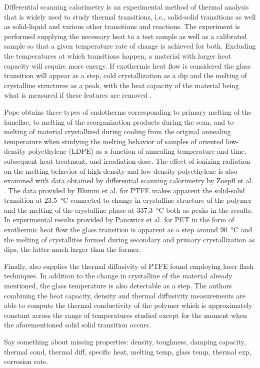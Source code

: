 Differential scanning calorimetry is an experimental method of thermal analysis that is widely used to study thermal transitions, i.e., solid-solid transitions as well as solid-liquid and various other transitions and reactions.
The experiment is performed supplying the necessary heat to a test sample as well as a calibrated sample so that a given temperature rate of change is achieved for both.
Excluding the temperatures at which transitions happen, a material with larger heat capacity will require more energy.
If exothermic heat flow is considered the glass transition will appear as a step, cold crystallization as a dip and the melting of crystalline structures as a peak, with the heat capacity of the material being what is measured if these features are removed \citep{lukasDifferentialScanningCalorimetry2009}.

Pope \citep{popeCharacterizationOrientedLowdensity1976} obtains three types of endotherms corresponding to primary melting of the lamellae, to melting of the reorganization products during the scan, and to melting of material crystallized during cooling from the original annealing temperature when studying the melting behavior of samples of oriented low-density polyethylene (LDPE) as a function of annealing temperature and time, subsequent heat treatment, and irradiation dose.
The effect of ionizing radiation on the melting behavior of high-density and low-density
polyethylene is also examined with data obtained by differential scanning calorimetry by Zoepfl et al. \citep{zoepflDifferentialScanningCalorimetry1984}.
The data provided by Blumm et al. \citep{blummCharacterizationPTFEUsing2010} for PTFE makes apparent the solid-solid transition at \SI{23.5}{\celsius} connected to change in crystalline structure of the polymer and the melting of the crystalline phase at \SI{337.3}{\celsius} both as peaks in the results.
In experimental results provided by Panowicz et al. \citep{panowiczPropertiesPolyethyleneTerephthalate2021} for PET in the form of exothermic heat flow the glass transition is apparent as a step around \SI{90}{\celsius} and the melting of crystallites formed during secondary and primary crystallization as dips, the latter much larger than the former.

Finally, \cite{blummCharacterizationPTFEUsing2010} also supplies the thermal diffusivity of PTFE found employing laser flash techniques.
In addition to the change in crystalline of the material already mentioned, the glass temperature is also detectable as a step.
The authors combining the heat capacity, density and thermal diffusivity measurements are able to compute the thermal conductivity of the polymer which is approximately constant across the range of temperatures studied except for the moment when the aforementioned solid solid transition occurs.

\colorbox{BrickRed}{Say something about missing properties: density, toughness, damping capacity, thermal cond, thermal diff, specific heat, melting temp, glass temp, thermal exp, corrosion rate.}

